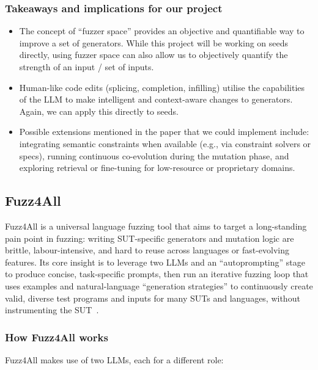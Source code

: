 \subsubsection{Takeaways and implications for our project}

\begin{itemize}
    \item The concept of ``fuzzer space'' provides an objective and quantifiable way to improve a set of generators. While this project will be working on seeds directly, using fuzzer space can also allow us to objectively quantify the strength of an input / set of inputs.
    \item Human-like code edits (splicing, completion, infilling) utilise the capabilities of the LLM to make intelligent and context-aware changes to generators. Again, we can apply this directly to seeds.
    \item Possible extensions mentioned in the paper that we could implement include: integrating semantic constraints when available (e.g., via constraint solvers or specs), running continuous co-evolution during the mutation phase, and exploring retrieval or fine-tuning for low-resource or proprietary domains.
\end{itemize}





\subsection{Fuzz4All}

Fuzz4All is a universal language fuzzing tool that aims to target a long-standing pain point in fuzzing: writing SUT-specific generators and mutation logic are brittle, labour-intensive, and hard to reuse across languages or fast-evolving features. Its core insight is to leverage two LLMs and an ``autoprompting'' stage to produce concise, task-specific prompts, then run an iterative fuzzing loop that uses examples and natural-language ``generation strategies'' to continuously create valid, diverse test programs and inputs for many SUTs and languages, without instrumenting the SUT~\cite{xia_2023_universal}.

\subsubsection{How Fuzz4All works}

Fuzz4All makes use of two LLMs, each for a different role:

